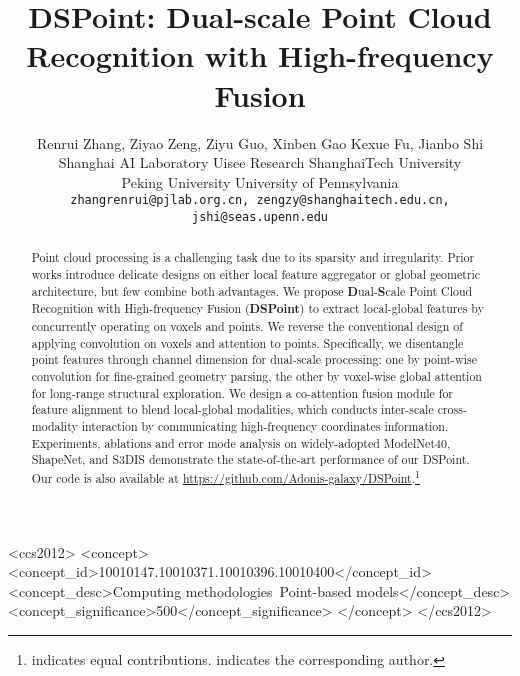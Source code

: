 \documentclass[sigconf]{acmart}
\begin{document}
\title{DSPoint: Dual-scale Point Cloud Recognition with High-frequency Fusion}















\author{Renrui Zhang, Ziyao Zeng, Ziyu Guo, Xinben Gao 
Kexue Fu, Jianbo Shi\\
  Shanghai AI Laboratory \quad 
  Uisee Research \quad
  ShanghaiTech University \quad\\
  Peking University \quad
  University of Pennsylvania \quad
\\
\texttt{zhangrenrui@pjlab.org.cn,
zengzy@shanghaitech.edu.cn,
jshi@seas.upenn.edu} \\
}


\renewcommand{\shortauthors}{Renrui, Ziyao and Ziyu, et al.}

\begin{abstract}
Point cloud processing is a challenging task due to its sparsity and irregularity. Prior works introduce delicate designs on either local feature aggregator or global geometric architecture, but few combine both advantages.   We propose \textbf{D}ual-\textbf{S}cale Point Cloud Recognition with High-frequency Fusion (\textbf{DSPoint}) to extract local-global features by concurrently operating on voxels and points.  We reverse the conventional design of applying convolution on voxels and attention to points.  Specifically, we disentangle point features through channel dimension for dual-scale processing: one by point-wise convolution for fine-grained geometry parsing, the other by voxel-wise global attention for long-range structural exploration. We design a co-attention fusion module for feature alignment to blend local-global modalities, which conducts inter-scale cross-modality interaction by communicating high-frequency coordinates information. Experiments, ablations and error mode analysis on widely-adopted ModelNet40, ShapeNet, and S3DIS demonstrate the state-of-the-art performance of our DSPoint. Our code is also available at \url{https://github.com/Adonis-galaxy/DSPoint}.\footnote{ indicates equal contributions.  indicates the corresponding author.}
\end{abstract}


\begin{CCSXML}
<ccs2012>
   <concept>
       <concept_id>10010147.10010371.10010396.10010400</concept_id>
       <concept_desc>Computing methodologies~Point-based models</concept_desc>
       <concept_significance>500</concept_significance>
       </concept>
 </ccs2012>
\end{CCSXML}
\end{document}
